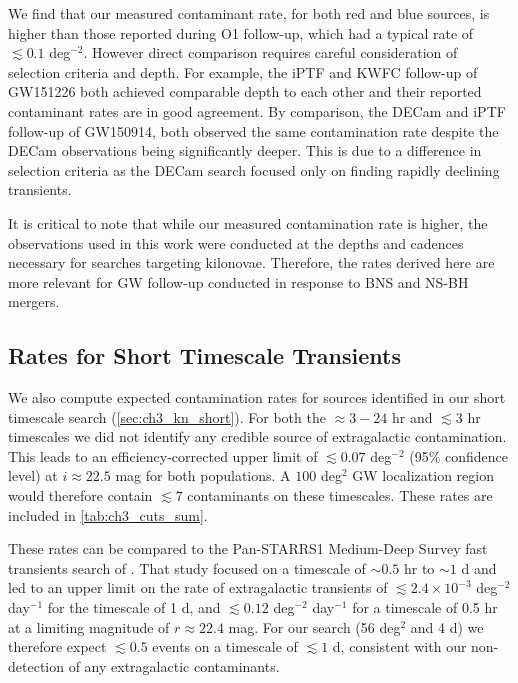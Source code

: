 We find that our measured contaminant rate, for both red and blue sources, is higher than those reported during O1 follow-up, which had a typical rate of  $\lesssim 0.1$ deg$^{-2}$. However direct comparison requires careful consideration of selection criteria and depth. For example, the iPTF and KWFC follow-up of GW151226 both achieved comparable depth to each other and their reported contaminant rates are in good agreement. By comparison, the DECam and iPTF follow-up of GW150914, both observed the same contamination rate despite the DECam observations being significantly deeper. This is due to a difference in selection criteria as the DECam search focused only on finding rapidly declining transients.

It is critical to note that while our measured contamination rate is higher, the observations used in this work were conducted at the depths and cadences necessary for searches targeting kilonovae. Therefore, the rates derived here are more relevant for GW follow-up conducted in response to BNS and NS-BH mergers.

\subsection{Rates for Short Timescale Transients}
\label{sec:ch3_rates_short}

We also compute expected contamination rates for sources identified in our short timescale search (\cref{sec:ch3_kn_short}). For both the $\approx 3-24$ hr and $\lesssim 3$ hr timescales we did not identify any credible source of extragalactic contamination. This leads to an efficiency-corrected upper limit of $\lesssim 0.07$ deg$^{-2}$ (95\% confidence level) at $i\approx 22.5$ mag for both populations. A $100$ deg$^2$ GW localization region would therefore contain $\lesssim 7$ contaminants on these timescales. These rates are included in \cref{tab:ch3_cuts_sum}.

These rates can be compared to the Pan-STARRS1 Medium-Deep Survey fast transients search of \cite{Berger+13}. That study focused on a timescale of $\sim 0.5$ hr to $\sim 1$ d and led to an upper limit on the rate of extragalactic transients of $\lesssim 2.4\times 10^{-3}$ deg$^{-2}$ day$^{-1}$ for the timescale of 1 d, and $\lesssim 0.12$ deg$^{-2}$ day$^{-1}$ for a timescale of 0.5 hr at a limiting magnitude of $r\approx 22.4$ mag. For our search (56 deg$^2$ and 4 d) we therefore expect $\lesssim 0.5$ events on a timescale of $\lesssim 1$ d, consistent with our non-detection of any extragalactic contaminants.

